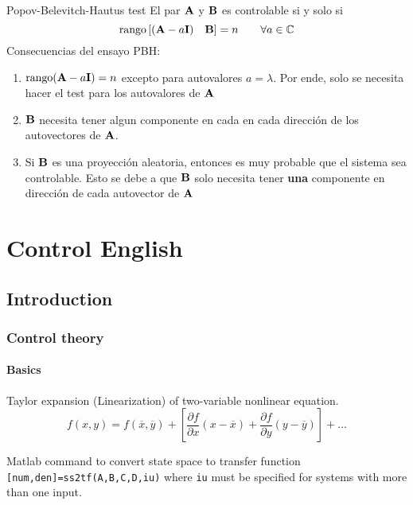 \documentclass[11pt, a4paper, twoside, openright, openany]{book}
\newcommand{\dimss}{\dimfont{n}}
\begin{document}
\begin{definition}{Popov-Belevitch-Hautus test}
El par $\mathbf{A}$ y $\mathbf{B}$ es controlable si y solo si 
\[
\operatorname{rango}\left[(\MA - a\eye)\quad \MB \right] = \dimss  \qquad \forall a \in \mathbb{C}
\]
Consecuencias del ensayo PBH:
\begin{enumerate}
\item \(\operatorname{rango}(\mathbf{A} - a\mathbf{I})=n\) excepto para autovalores $a=\lambda$. Por ende, solo se necesita hacer el test para los autovalores de $\mathbf{A}$
\item $\mathbf{B}$ necesita  tener algun componente en cada en cada dirección de los autovectores de $\mathbf{A}$.
\item  Si $\mathbf{B}$ es una proyección aleatoria, entonces es muy probable que el sistema sea controlable. Esto se debe a que $\mathbf{B}$ solo necesita tener \textbf{una} componente en dirección de cada autovector de $\mathbf{A}$
\end{enumerate}

\end{definition}








\part{Control English}
\chapter{Introduction}

\section{Control theory}
\subsection{Basics}
Taylor expansion (Linearization) of two-variable nonlinear equation.
\[
f(x,y) = f(\overline{x},\overline{y}) + \left[ \frac{\partial f}{\partial x} (x-\overline{x}) +\frac{\partial f}{\partial y} (y-\overline{y}) \right] + \ldots
\]


Matlab command to convert state space to transfer function \verb|[num,den]=ss2tf(A,B,C,D,iu)| where \verb|iu| must be specified for systems with more than one input.
\end{document}
